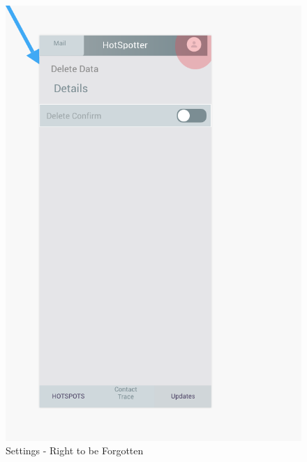\documentclass{scrreprt}
\begin{document}
\begin{figure}[H]
	\centering
	\includegraphics[page=1, width=0.9\linewidth]{COMP30830-DeleteData}
	\caption{Settings - Right to be Forgotten}
	\label{Delete}
\end{figure}
\end{document}
